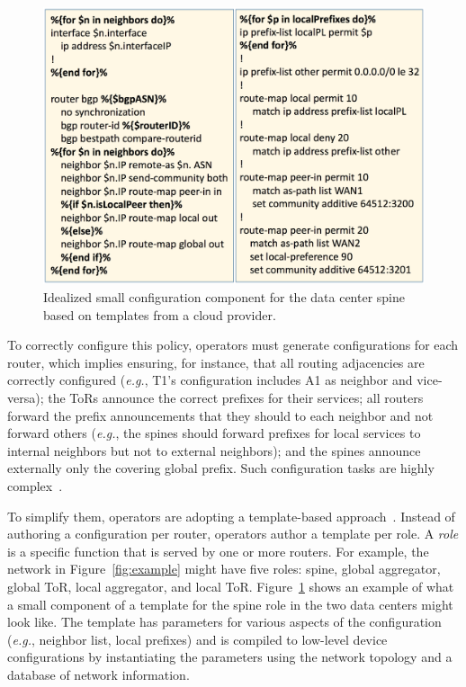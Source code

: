 \documentclass[numbers, 10pt, preprint]{sigplanconf}
\newcommand{\EG}{\emph{e.g.}}
\begin{document}
\begin{figure}[t!]
  \centering
  \includegraphics[width=\columnwidth]{figures/templates}
  \caption{Idealized small configuration component for the data center spine based on templates from a cloud provider.}
  \label{fig:templates}
  \vspace{-.8em}
\end{figure}


To correctly configure this policy, operators must generate configurations for each router, which implies ensuring, for instance, that all routing adjacencies are correctly configured (\EG, T1's configuration includes A1 as neighbor and vice-versa); the ToRs announce the correct prefixes for their services; all routers  forward the prefix announcements that they should to each neighbor and not forward others (\EG, the spines should forward prefixes for local services to internal neighbors but not to external neighbors); and the spines announce externally only the covering global prefix. Such configuration tasks are highly complex~\cite{juniper-study,bgpmon,batfish,propane}.

To simplify them, operators are adopting a template-based approach~\cite{hatch,thwack}. Instead of authoring a configuration per router, operators author a template per role.
%
A {\em role} is a specific function that is served by one or more routers.
%
For example, the network in Figure~\ref{fig:example} might have five roles: spine, global aggregator, global ToR, local aggregator, and local ToR.
%
Figure~\ref{fig:templates} shows an example of what a small component of a template for the spine role in the two data centers might look like. The template has parameters for various aspects of the configuration (\EG, neighbor list, local prefixes) and is compiled to low-level device configurations by instantiating the parameters using the network topology and a database of network information.
\end{document}

